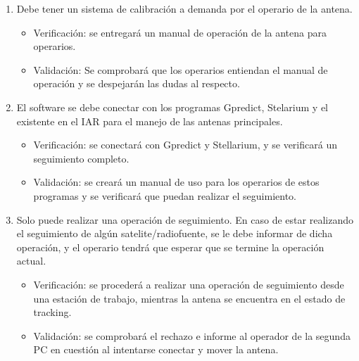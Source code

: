 \documentclass[11pt, %
codirector, %
]{charter}
\begin{document}
\begin{enumerate}
\begin{enumerate}
		\item Debe tener un sistema de calibración a demanda por el operario de la antena. 
			\begin{itemize}
				\item Verificación: se entregará un manual de operación de la antena para operarios.  
				\item Validación: Se comprobará que los operarios entiendan el manual de operación y se despejarán las dudas al respecto.   
			\end{itemize} 
		\item El software se debe conectar con los programas Gpredict, Stelarium y el existente en el IAR para el manejo de las antenas principales. 
			\begin{itemize}
				\item Verificación: se conectará con Gpredict y Stellarium, y se verificará un seguimiento completo.  
				\item Validación: se creará un manual de uso para los operarios de estos programas y se verificará que puedan realizar el seguimiento.   
			\end{itemize} 
		
		\setcounter{enumii}{10}	
		\item Solo puede realizar una operación de seguimiento. En caso de estar realizando el seguimiento de algún satelite/radiofuente, se le debe informar de dicha operación, y el operario tendrá que esperar que se termine la operación actual.  
			\begin{itemize}
				\item Verificación: se procederá a realizar una operación de seguimiento desde una estación de trabajo, mientras la antena se encuentra en el estado de tracking.   
				\item Validación: se comprobará el rechazo e informe al operador de la segunda PC en cuestión al intentarse conectar y mover la antena.   
			\end{itemize} 
	\end{enumerate}


\end{enumerate}
\end{document}
